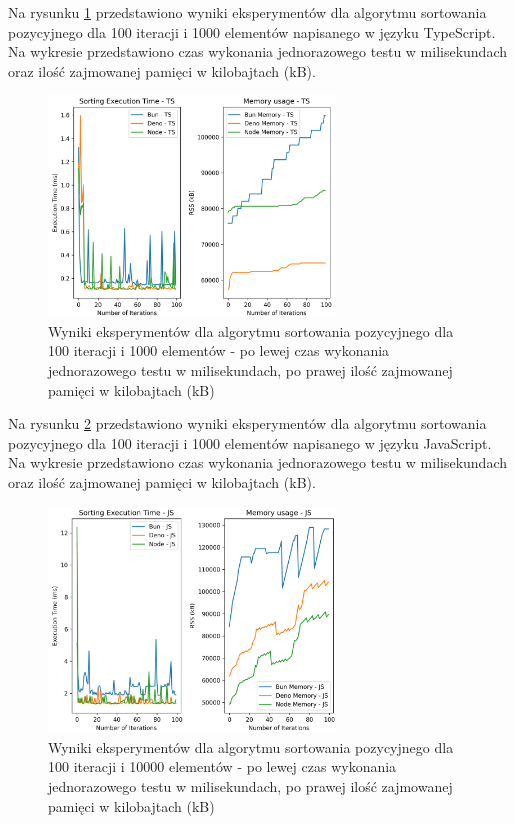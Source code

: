Na rysunku \ref{fig:radix_sorting_e1_ts} przedstawiono wyniki eksperymentów dla algorytmu sortowania pozycyjnego dla 100 iteracji i 1000 elementów napisanego w języku TypeScript. Na wykresie przedstawiono czas wykonania jednorazowego testu w milisekundach oraz ilość zajmowanej pamięci w kilobajtach (kB).

\begin{figure}[H]
  \centering
  \includegraphics[width=0.68\textwidth]{Figures/sorting/sorting_radix_100_1000_ts.png}
  \caption{Wyniki eksperymentów dla algorytmu sortowania pozycyjnego dla 100 iteracji i 1000 elementów - po lewej czas wykonania jednorazowego testu w milisekundach, po prawej ilość zajmowanej pamięci w kilobajtach (kB)}
  \label{fig:radix_sorting_e1_ts}
\end{figure}

Na rysunku \ref{fig:radix_sorting_e2} przedstawiono wyniki eksperymentów dla algorytmu sortowania pozycyjnego dla 100 iteracji i 1000 elementów napisanego w języku JavaScript. Na wykresie przedstawiono czas wykonania jednorazowego testu w milisekundach oraz ilość zajmowanej pamięci w kilobajtach (kB).

\begin{figure}[H]
  \centering
  \includegraphics[width=0.68\textwidth]{Figures/sorting/sorting_radix_100_10000_js.png}
  \caption{Wyniki eksperymentów dla algorytmu sortowania pozycyjnego dla 100 iteracji i 10000 elementów - po lewej czas wykonania jednorazowego testu w milisekundach, po prawej ilość zajmowanej pamięci w kilobajtach (kB)}
  \label{fig:radix_sorting_e2}
\end{figure}

